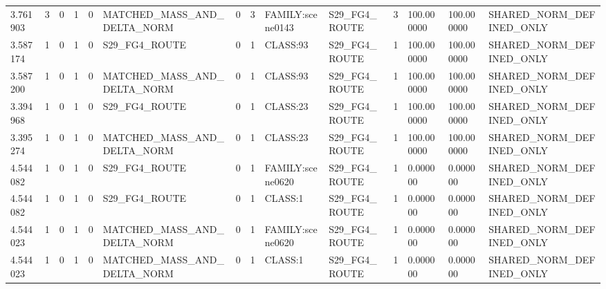 \begin{tabular}{llllllllllllll}
3.761903 & 3 & 0 & 1 & 0 & MATCHED\_MASS\_AND\_DELTA\_NORM & 0 & 3 & FAMILY:scene0143 & S29\_FG4\_ROUTE & 3 & 100.000000 & 100.000000 & SHARED\_NORM\_DEFINED\_ONLY \\
3.587174 & 1 & 0 & 1 & 0 & S29\_FG4\_ROUTE & 0 & 1 & CLASS:93 & S29\_FG4\_ROUTE & 1 & 100.000000 & 100.000000 & SHARED\_NORM\_DEFINED\_ONLY \\
3.587200 & 1 & 0 & 1 & 0 & MATCHED\_MASS\_AND\_DELTA\_NORM & 0 & 1 & CLASS:93 & S29\_FG4\_ROUTE & 1 & 100.000000 & 100.000000 & SHARED\_NORM\_DEFINED\_ONLY \\
3.394968 & 1 & 0 & 1 & 0 & S29\_FG4\_ROUTE & 0 & 1 & CLASS:23 & S29\_FG4\_ROUTE & 1 & 100.000000 & 100.000000 & SHARED\_NORM\_DEFINED\_ONLY \\
3.395274 & 1 & 0 & 1 & 0 & MATCHED\_MASS\_AND\_DELTA\_NORM & 0 & 1 & CLASS:23 & S29\_FG4\_ROUTE & 1 & 100.000000 & 100.000000 & SHARED\_NORM\_DEFINED\_ONLY \\
4.544082 & 1 & 0 & 1 & 0 & S29\_FG4\_ROUTE & 0 & 1 & FAMILY:scene0620 & S29\_FG4\_ROUTE & 1 & 0.000000 & 0.000000 & SHARED\_NORM\_DEFINED\_ONLY \\
4.544082 & 1 & 0 & 1 & 0 & S29\_FG4\_ROUTE & 0 & 1 & CLASS:1 & S29\_FG4\_ROUTE & 1 & 0.000000 & 0.000000 & SHARED\_NORM\_DEFINED\_ONLY \\
4.544023 & 1 & 0 & 1 & 0 & MATCHED\_MASS\_AND\_DELTA\_NORM & 0 & 1 & FAMILY:scene0620 & S29\_FG4\_ROUTE & 1 & 0.000000 & 0.000000 & SHARED\_NORM\_DEFINED\_ONLY \\
4.544023 & 1 & 0 & 1 & 0 & MATCHED\_MASS\_AND\_DELTA\_NORM & 0 & 1 & CLASS:1 & S29\_FG4\_ROUTE & 1 & 0.000000 & 0.000000 & SHARED\_NORM\_DEFINED\_ONLY \\
\bottomrule
\end{tabular}
